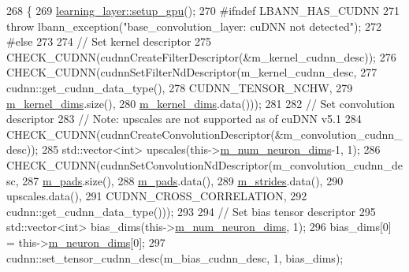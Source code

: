\begin{DoxyCode}
268                             \{
269     \hyperlink{classlbann_1_1Layer_a36aa22ef90ce4de65abe729d38490863}{learning\_layer::setup\_gpu}();
270 \textcolor{preprocessor}{  #ifndef LBANN\_HAS\_CUDNN}
271     \textcolor{keywordflow}{throw} lbann\_exception(\textcolor{stringliteral}{"base\_convolution\_layer: cuDNN not detected"});
272 \textcolor{preprocessor}{  #else}
273 
274     \textcolor{comment}{// Set kernel descriptor}
275     CHECK\_CUDNN(cudnnCreateFilterDescriptor(&m\_kernel\_cudnn\_desc));
276     CHECK\_CUDNN(cudnnSetFilterNdDescriptor(m\_kernel\_cudnn\_desc,
277                                            cudnn::get\_cudnn\_data\_type(),
278                                            CUDNN\_TENSOR\_NCHW,
279                                            \hyperlink{classlbann_1_1base__convolution__layer_a283edb6a476f975e713d0b4235ac658f}{m\_kernel\_dims}.size(),
280                                            \hyperlink{classlbann_1_1base__convolution__layer_a283edb6a476f975e713d0b4235ac658f}{m\_kernel\_dims}.data()));
281 
282     \textcolor{comment}{// Set convolution descriptor}
283     \textcolor{comment}{// Note: upscales are not supported as of cuDNN v5.1}
284     CHECK\_CUDNN(cudnnCreateConvolutionDescriptor(&m\_convolution\_cudnn\_desc));
285     std::vector<int> upscales(this->\hyperlink{classlbann_1_1Layer_adfd6178d21498c9095cd947ae1eb2d6a}{m\_num\_neuron\_dims}-1, 1);
286     CHECK\_CUDNN(cudnnSetConvolutionNdDescriptor(m\_convolution\_cudnn\_desc,
287                                                 \hyperlink{classlbann_1_1base__convolution__layer_a9732a8a0170a413bf0cde0128ad2a571}{m\_pads}.size(),
288                                                 \hyperlink{classlbann_1_1base__convolution__layer_a9732a8a0170a413bf0cde0128ad2a571}{m\_pads}.data(),
289                                                 \hyperlink{classlbann_1_1base__convolution__layer_a2429495822363e41f1f6b96a6b430445}{m\_strides}.data(),
290                                                 upscales.data(),
291                                                 CUDNN\_CROSS\_CORRELATION,
292                                                 cudnn::get\_cudnn\_data\_type()));
293 
294     \textcolor{comment}{// Set bias tensor descriptor}
295     std::vector<int> bias\_dims(this->\hyperlink{classlbann_1_1Layer_adfd6178d21498c9095cd947ae1eb2d6a}{m\_num\_neuron\_dims}, 1);
296     bias\_dims[0] = this->\hyperlink{classlbann_1_1Layer_abb34bb8031f57a483e2e327a5f229f48}{m\_neuron\_dims}[0];
297     cudnn::set\_tensor\_cudnn\_desc(m\_bias\_cudnn\_desc, 1, bias\_dims);

\end{DoxyCode}
